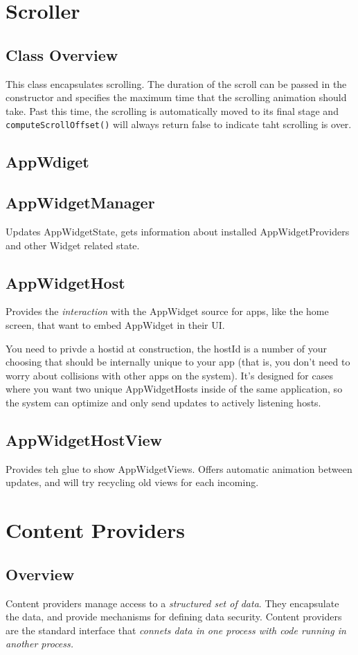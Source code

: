 \documentclass[11pt, a4paper]{book}
\begin{document}
\chapter{Scroller}
\section{Class Overview}
This class encapsulates scrolling. The duration of the scroll can be passed
 in the constructor and specifies the maximum time that the scrolling animation
should take. Past this time, the scrolling is automatically moved to its final
stage and \verb|computeScrollOffset()| will always return false to indicate taht
scrolling is over.

\section{AppWdiget}
\section{AppWidgetManager}
Updates AppWidgetState, gets information about installed AppWidgetProviders and
other Widget related state.
\section{AppWidgetHost}
Provides the \emph{interaction} with the AppWidget source for apps, like the
home screen, that want to embed AppWidget in their UI.

You need to privde a hostid at construction, the hostId is a number of your 
choosing that should be internally unique to your app (that is, you don't 
need to worry about collisions with other apps on the system).  It's designed 
for cases where you want two unique AppWidgetHosts inside of the same 
application, so the system can optimize and only send updates to actively 
listening hosts. 


\section{AppWidgetHostView}
Provides teh glue to show AppWidgetViews. Offers automatic animation between
updates, and will try recycling old views for each incoming.

\chapter{Content Providers}
\section{Overview}
Content providers manage access to a \emph{structured set of data}. They
encapsulate the data, and provide mechanisms for defining data security. Content
providers are the standard interface that \emph{connets data in one process with
code running in another process.}
\end{document}
